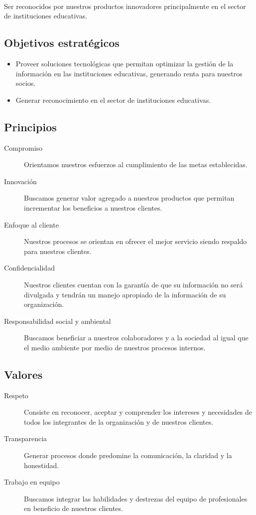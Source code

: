     \paragraph*{}
    Ser reconocidos por nuestros productos innovadores principalmente en el sector de instituciones educativas.
  
  \subsection{Objetivos estratégicos}
    \begin{itemize}
  	  \item Proveer soluciones tecnológicas que permitan optimizar la gestión de la información en las instituciones educativas, generando renta para nuestros socios.
      \item Generar reconocimiento en el sector de instituciones educativas.
    \end{itemize}

  \subsection{Principios}
    \begin{description}
    	\item[Compromiso] Orientamos nuestros esfuerzos al cumplimiento de las metas establecidas.
    	\item[Innovación] Buscamos generar valor agregado a nuestros productos que permitan incrementar los beneficios a nuestros clientes.
    	\item[Enfoque al cliente] Nuestros procesos se orientan en ofrecer el mejor servicio siendo respaldo para nuestros clientes.
    	\item[Confidencialidad] Nuestros clientes cuentan con la garantía de que su información no será divulgada y tendrán un manejo apropiado de la información de su organización.
    	\item[Responsabilidad social y ambiental] Buscamos beneficiar a nuestros colaboradores y a la sociedad al igual que el medio ambiente por medio de nuestros procesos internos.
    \end{description}
    
    \subsection{Valores}
      \begin{description}
		\item[Respeto] Consiste en reconocer, aceptar y comprender los intereses y necesidades de todos los integrantes de la organización y de nuestros clientes.
		\item[Transparencia] Generar procesos donde predomine la comunicación, la claridad y la honestidad.
		\item[Trabajo en equipo] Buscamos integrar las habilidades y destrezas del equipo de profesionales en beneficio de nuestros clientes.
    \end{description}

